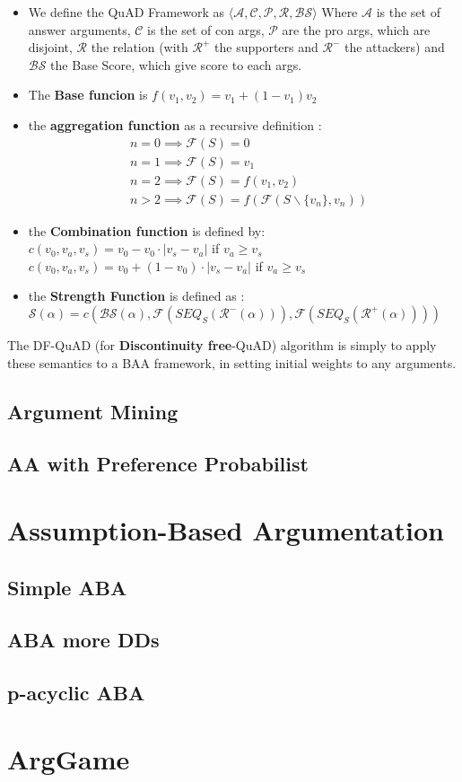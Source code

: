 			\begin{definition}
				\begin{itemize}
					\item We define the QuAD Framework as $\langle \mathcal{A}, \mathcal{C}, \mathcal{P}, \mathcal{R}, \mathcal{BS}\rangle $ Where $\mathcal{A}$ is the set of answer arguments, $\mathcal{C}$ is the set of con args, $\mathcal{P}$ are the pro args, which are disjoint, $\mathcal{R}$ the relation (with $\mathcal{R}^+$ the supporters and $\mathcal{R}^-$ the attackers) and $\mathcal{BS}$ the Base Score, which give score to each args. 
					\item The \textbf{Base funcion} is $f(v_1, v_2) = v_1 + (1-v_1)v_2$
					\item the \textbf{aggregation function} as a recursive definition : 
					\begin{align*}
						& n=0 \implies \mathcal{F}(S)=0\\
						& n=1 \implies \mathcal{F}(S)= v_1\\
						& n=2 \implies \mathcal{F}(S)= f(v_1, v_2)\\
						& n>2 \implies \mathcal{F}(S)= f(\mathcal{F}(S\backslash \{v_n\}, v_n))
					\end{align*}
					\item the \textbf{Combination function} is defined by: \\
					$c(v_0, v_a, v_s) = v_0 - v_0 \cdot |v_s-v_a|$ if $v_a \geq v_s$\\
					$c(v_0, v_a, v_s) = v_0 + (1 - v_0 ) \cdot |v_s-v_a|$ if $v_a \geq v_s$
					\item the \textbf{Strength Function} is defined as : $\mathcal{S}(\alpha) = c(\mathcal{BS}(\alpha), \mathcal{F}(SEQ_S(\mathcal{R}^-(\alpha))), \mathcal{F}(SEQ_S(\mathcal{R}^+(\alpha))))$
				\end{itemize}
			\end{definition}

			The DF-QuAD (for \textbf{Discontinuity free}-QuAD) algorithm is simply to apply these semantics to a BAA framework, in setting initial weights to any arguments. 


	\subsection{Argument Mining}
	\subsection{AA with Preference Probabilist}

\section{Assumption-Based Argumentation}

	\subsection{Simple ABA}
	\subsection{ABA more DDs}
	\subsection{p-acyclic ABA}

\section{ArgGame}
